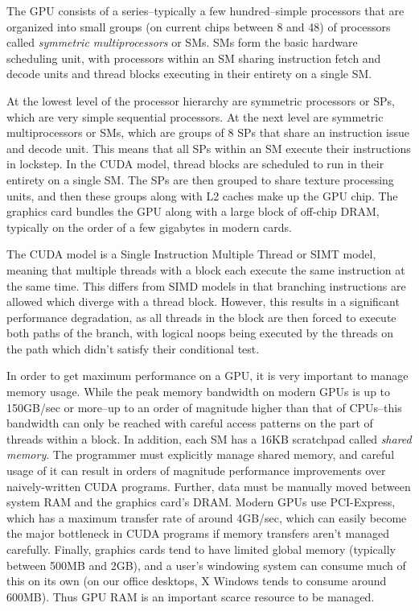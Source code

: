 \documentclass[preprint]{sigplanconf}
\begin{document}
The GPU consists of a series--typically a few hundred--simple processors that
are organized into small groups (on current chips between 8 and 48) of
processors called {\it symmetric multiprocessors} or SMs.  SMs form the basic
hardware scheduling unit, with processors within an SM sharing instruction
fetch and decode units and thread blocks executing in their entirety on a
single SM.

At the lowest level of the processor hierarchy are symmetric
processors or SPs, which are very simple sequential processors.  At the
next level are symmetric multiprocessors or SMs, which are groups of 8 SPs that
share an instruction issue and decode unit.  This means that all SPs within an
SM execute their instructions in lockstep.  In the CUDA model, thread blocks are
scheduled to run in their entirety on a single SM.  The SPs are then grouped to
share texture processing units, and then these groups along with L2 caches make
up the GPU chip.  The graphics card bundles the GPU along with a large block of
off-chip DRAM, typically on the order of a few gigabytes in modern cards.

The CUDA model is a Single Instruction Multiple Thread or SIMT model, meaning
that multiple threads with a block each execute the same instruction at the same
time.  This differs from SIMD models in that branching instructions are allowed
which diverge with a thread block.  However, this results in a significant
performance degradation, as all threads in the block are then forced to execute
both paths of the branch, with logical noops being executed by the threads on
the path which didn't satisfy their conditional test.

In order to get maximum performance on a GPU, it is very important to manage
memory usage.  While the peak memory bandwidth on modern GPUs is up to 150GB/sec
or more--up to an order of magnitude higher than that of CPUs--this bandwidth
can only be reached with careful access patterns on the part of threads within a
block.  In addition, each SM has a 16KB scratchpad called {\it shared memory}.
The programmer must explicitly manage shared memory, and careful usage of it can
result in orders of magnitude performance improvements over naively-written CUDA
programs.  Further, data must be manually moved between system RAM and the
graphics card's DRAM.  Modern GPUs use PCI-Express, which has a maximum transfer
rate of around 4GB/sec, which can easily become the major bottleneck in CUDA
programs if memory transfers aren't managed carefully.  Finally, graphics cards
tend to have limited global memory (typically between 500MB and 2GB), and a
user's windowing system can consume much of this on its own (on our office
desktops, X Windows tends to consume around 600MB).  Thus GPU RAM is an
important scarce resource to be managed.
\end{document}
